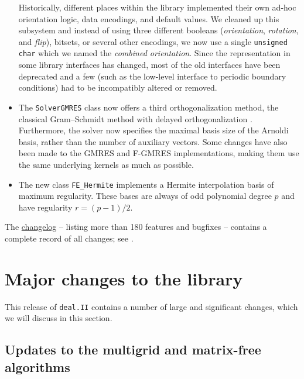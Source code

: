 \documentclass{ansarticle-preprint}
\newcommand{\specialword}[1]{\texttt{#1}}
\newcommand{\dealii}{{\specialword{deal.II}}\xspace}
\begin{document}
\begin{itemize}
    Historically, different places within the library implemented their own
    ad-hoc orientation logic, data encodings, and default values. We cleaned up
    this subsystem and instead of using three different booleans
    (\emph{orientation}, \emph{rotation}, and \emph{flip}), bitsets, or several
    other encodings, we now use a single \texttt{unsigned char} which we named the
    \emph{combined orientation}. Since the representation in some library
    interfaces has changed, most of the old interfaces have been deprecated and
    a few (such as the low-level interface to periodic boundary conditions) had
    to be incompatibly altered or removed.
\item The \texttt{SolverGMRES} class now offers a third orthogonalization
  method, the classical Gram--Schmidt method with delayed orthogonalization
  \cite{Bielich2022}. Furthermore, the solver now specifies the maximal basis
  size of the Arnoldi basis, rather than the number of auxiliary
  vectors. Some changes have also been made to the GMRES and F-GMRES
  implementations, making them use the same underlying kernels as much as possible.
\item The new class \texttt{FE\_Hermite} implements a Hermite interpolation basis of
  maximum regularity. These bases are always of odd polynomial degree $p$ and have
  regularity $r=(p-1)/2$.

\end{itemize}
%
The
\href{https://dealii.org/developer/doxygen/deal.II/changes_between_9_5_2_and_9_6_0.html}{changelog}
-- listing more than 180 features and bugfixes --
contains a complete record of all changes; see \cite{changes96}.

\section{Major changes to the library}
\label{sec:major}

This release of \dealii contains a number of large and significant changes,
which we will discuss in this section.



\subsection{Updates to the multigrid and matrix-free algorithms}\label{sec:mf}
\end{document}
